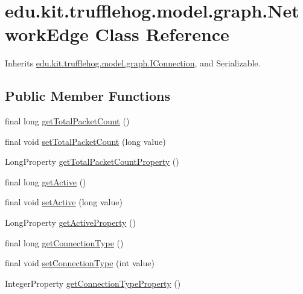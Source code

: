 \hypertarget{classedu_1_1kit_1_1trufflehog_1_1model_1_1graph_1_1_network_edge}{}\section{edu.\+kit.\+trufflehog.\+model.\+graph.\+Network\+Edge Class Reference}
\label{classedu_1_1kit_1_1trufflehog_1_1model_1_1graph_1_1_network_edge}


Inherits \hyperlink{interfaceedu_1_1kit_1_1trufflehog_1_1model_1_1graph_1_1_i_connection}{edu.\+kit.\+trufflehog.\+model.\+graph.\+I\+Connection}, and Serializable.

\subsection*{Public Member Functions}
\begin{DoxyCompactItemize}
\item 
final long \hyperlink{classedu_1_1kit_1_1trufflehog_1_1model_1_1graph_1_1_network_edge_aab42ecaad9c4bd743090dcd198eb1d9d}{get\+Total\+Packet\+Count} ()
\item 
final void \hyperlink{classedu_1_1kit_1_1trufflehog_1_1model_1_1graph_1_1_network_edge_a62a1b37aecc002b4095447a6d349623c}{set\+Total\+Packet\+Count} (long value)
\item 
Long\+Property \hyperlink{classedu_1_1kit_1_1trufflehog_1_1model_1_1graph_1_1_network_edge_a1f2811c1470a837cfb0103dfb5fd8d58}{get\+Total\+Packet\+Count\+Property} ()
\item 
final long \hyperlink{classedu_1_1kit_1_1trufflehog_1_1model_1_1graph_1_1_network_edge_a033cb5cb37a58541c232a5edde12676f}{get\+Active} ()
\item 
final void \hyperlink{classedu_1_1kit_1_1trufflehog_1_1model_1_1graph_1_1_network_edge_acd48e38c1f87d1cf111d94af39f5b33e}{set\+Active} (long value)
\item 
Long\+Property \hyperlink{classedu_1_1kit_1_1trufflehog_1_1model_1_1graph_1_1_network_edge_a1288c43918ac44992b9843052646cd6f}{get\+Active\+Property} ()
\item 
final long \hyperlink{classedu_1_1kit_1_1trufflehog_1_1model_1_1graph_1_1_network_edge_ac6e2e739530941d2e80d476cb99ce0f9}{get\+Connection\+Type} ()
\item 
final void \hyperlink{classedu_1_1kit_1_1trufflehog_1_1model_1_1graph_1_1_network_edge_a01b2bcc0a4fb2419be81941444ba90ad}{set\+Connection\+Type} (int value)
\item 
Integer\+Property \hyperlink{classedu_1_1kit_1_1trufflehog_1_1model_1_1graph_1_1_network_edge_af5db7d7402be0b28208df8158b7e080d}{get\+Connection\+Type\+Property} ()
\end{DoxyCompactItemize}


